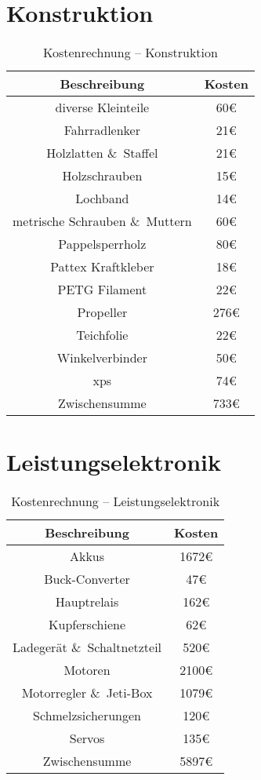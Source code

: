 \section{Konstruktion}
\begin{table}[H]
    \centering
    \begin{tabular}{|c|c|}
        \hline
        \textbf{Beschreibung} & \textbf{Kosten}\\\hline
        diverse Kleinteile & 60\euro\\
        Fahrradlenker & 21\euro\\
        Holzlatten \&\ Staffel & 21\euro\\
        Holzschrauben & 15\euro\\
        Lochband & 14\euro\\
        metrische Schrauben \&\ Muttern & 60\euro\\
        Pappelsperrholz & 80\euro\\
        Pattex Kraftkleber & 18\euro\\
        PETG Filament & 22\euro\\
        Propeller & 276\euro\\
        Teichfolie & 22\euro\\
        Winkelverbinder & 50\euro\\
        \acs{xps} & 74\euro\\        
        \hline
        Zwischensumme & 733\euro\\\hline
    \end{tabular}
    \caption{Kostenrechnung -- Konstruktion}
\end{table}

\section{Leistungselektronik}
\begin{table}[H]
    \centering
    \begin{tabular}{|c|c|}
        \hline
        \textbf{Beschreibung} & \textbf{Kosten}\\\hline
        Akkus & 1672\euro\\
        Buck-Converter & 47\euro\\
        Hauptrelais & 162\euro\\
        Kupferschiene & 62\euro\\
        Ladegerät \&\ Schaltnetzteil & 520\euro\\
        Motoren & 2100\euro\\
        Motorregler \&\ Jeti-Box & 1079\euro\\
        Schmelzsicherungen & 120\euro\\
        Servos & 135\euro\\
        \hline
        Zwischensumme & 5897\euro\\\hline
    \end{tabular}
    \caption{Kostenrechnung -- Leistungselektronik}
\end{table}

